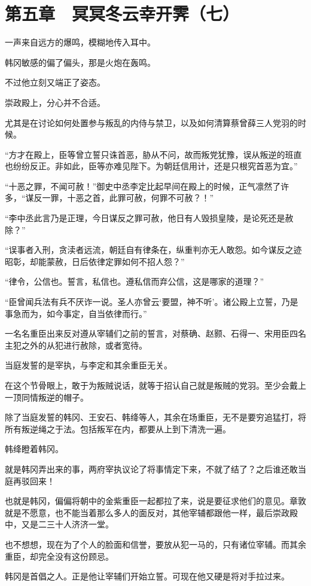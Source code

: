 \section{第五章　冥冥冬云幸开霁（七）}

一声来自远方的爆鸣，模糊地传入耳中。

韩冈敏感的偏了偏头，那是火炮在轰鸣。

不过他立刻又端正了姿态。

崇政殿上，分心并不合适。

尤其是在讨论如何处置参与叛乱的内侍与禁卫，以及如何清算蔡曾薛三人党羽的时候。

“方才在殿上，臣等曾立誓只诛首恶，胁从不问，故而叛党犹豫，误从叛逆的班直也纷纷反正。非如此，臣等亦难见陛下。为朝廷信用计，还是只根究首恶为宜。”

“十恶之罪，不闻可赦！”御史中丞李定比起早间在殿上的时候，正气凛然了许多，“谋反一罪，十恶之首，此罪可赦，何罪不可赦？！”

“李中丞此言乃是正理，今日谋反之罪可赦，他日有人毁损皇陵，是论死还是赦除？”

“误事者入刑，贪渎者远流，朝廷自有律条在，纵重判亦无人敢怨。如今谋反之迹昭彰，却能蒙赦，日后依律定罪如何不招人怨？”

“律令，公信也。誓言，私信也。遵私信而弃公信，这是哪家的道理？”

“臣曾闻兵法有兵不厌诈一说。圣人亦曾云‘要盟，神不听’。诸公殿上立誓，乃是事急而为，如今事定，自当依律而行。”

一名名重臣出来反对遵从宰辅们之前的誓言，对蔡确、赵颢、石得一、宋用臣四名主犯之外的从犯进行赦除，或者宽待。

当庭发誓的是宰执，与李定和其余重臣无关。

在这个节骨眼上，敢于为叛贼说话，就等于招认自己就是叛贼的党羽。至少会戴上一顶同情叛逆的帽子。

除了当庭发誓的韩冈、王安石、韩绛等人，其余在场重臣，无不是要穷追猛打，将所有叛逆绳之于法。包括叛军在内，都要从上到下清洗一遍。

韩绛瞪着韩冈。

就是韩冈弄出来的事，两府宰执议论了将事情定下来，不就了结了？之后谁还敢当庭再驳回来！

也就是韩冈，偏偏将朝中的金紫重臣一起都拉了来，说是要征求他们的意见。章敦就是不愿意，也不能当着那么多人的面反对，其他宰辅都跟他一样，最后崇政殿中，又是二三十人济济一堂。

也不想想，现在为了个人的脸面和信誉，要放从犯一马的，只有诸位宰辅。而其余重臣，却完全没有这份顾忌。

韩冈是首倡之人。正是他让宰辅们开始立誓。可现在他又硬是将对手拉过来。

